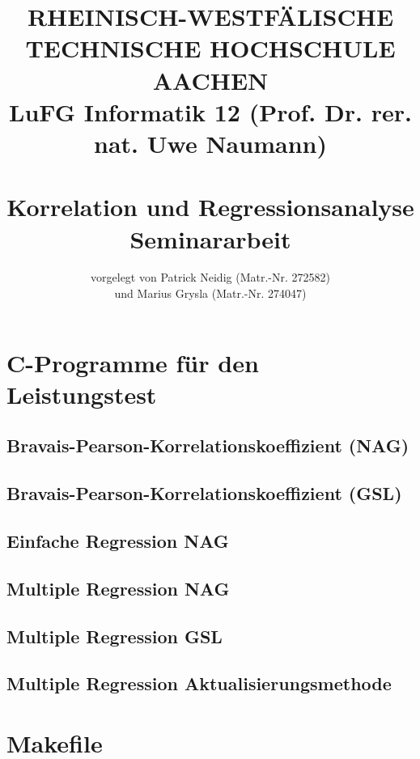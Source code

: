\documentclass{article}
\title{
{\bf \scriptsize RHEINISCH-WESTF\"ALISCHE TECHNISCHE HOCHSCHULE AACHEN \\
LuFG Informatik 12 (Prof. Dr. rer. nat. Uwe Naumann)}
\vspace{.5cm} \\
\epsfig{file=figures/STCE_Logo_WWW.eps,width=.7\textwidth}
\vspace{1cm} \\
{\bf \Large Korrelation und Regressionsanalyse} \\
{\large Seminararbeit} 
}
\author{vorgelegt von Patrick Neidig (Matr.-Nr. 272582)\\
	und Marius Grysla (Matr.-Nr. 274047)}
\begin{document}


\pagestyle{headings}

\maketitle

\newpage
\tableofcontents

\newpage














\appendix

\lstset{basicstyle=\tiny, numberstyle=\tiny}

\section{C-Programme für den Leistungstest}

\subsection{Bravais-Pearson-Korrelationskoeffizient (NAG)}


\subsection{Bravais-Pearson-Korrelationskoeffizient (GSL)}


\subsection{Einfache Regression NAG}


\subsection{Multiple Regression NAG}


\subsection{Multiple Regression GSL}


\subsection{Multiple Regression Aktualisierungsmethode}


\section{Makefile}

\end{document}
